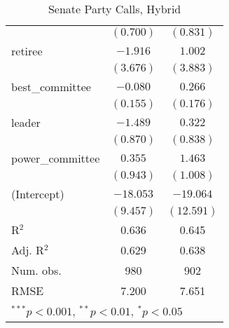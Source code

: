 \documentclass[12pt]{article}
\begin{document}
\begin{table}
\begin{center}
\begin{tabular}{l c c }
			& $(0.700)$      & $(0.831)$      \\
			retiree                       & $-1.916$       & $1.002$        \\
			& $(3.676)$      & $(3.883)$      \\
			best\_committee               & $-0.080$       & $0.266$        \\
			& $(0.155)$      & $(0.176)$      \\
			leader                        & $-1.489$       & $0.322$        \\
			& $(0.870)$      & $(0.838)$      \\
			power\_committee              & $0.355$        & $1.463$        \\
			& $(0.943)$      & $(1.008)$      \\
			(Intercept)                   & $-18.053$      & $-19.064$      \\
			& $(9.457)$      & $(12.591)$     \\
			\hline
			R$^2$                         & 0.636          & 0.645          \\
			Adj. R$^2$                    & 0.629          & 0.638          \\
			Num. obs.                     & 980            & 902            \\
			RMSE                          & 7.200          & 7.651          \\
			\hline
			\multicolumn{3}{l}{\scriptsize{$^{***}p<0.001$, $^{**}p<0.01$, $^*p<0.05$}}
		\end{tabular}
		\caption{Senate Party Calls, Hybrid}
	\end{center}
\end{table}
\end{document}
